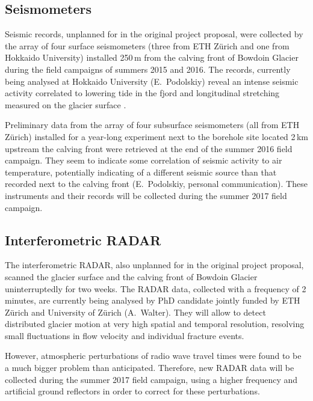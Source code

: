 \documentclass{article}
\begin{document}
\subsection{Seismometers}

Seismic records, unplanned for in the original project proposal, were collected
by the array of four surface seismometers (three from ETH Zürich and one from
Hokkaido University) installed 250\,m from the calving front of Bowdoin Glacier
during the field campaigns of summers 2015 and 2016. The records, currently
being analysed at Hokkaido University (E.~Podolskiy) reveal an intense seismic
activity correlated to lowering tide in the fjord and longitudinal stretching
measured on the glacier surface \citep{Podolskiy.etal.2016}.

Preliminary data from the array of four subsurface seismometers (all from ETH
Zürich) installed for a year-long experiment next to the borehole site located
2\,km upstream the calving front were retrieved at the end of the summer 2016
field campaign. They seem to indicate some correlation of seismic activity to
air temperature, potentially indicating of a different seismic source than that
recorded next to the calving front (E.~Podolskiy, personal communication).
These instruments and their records will be collected during the summer 2017
field campaign.


\subsection{Interferometric RADAR}

The interferometric RADAR, also unplanned for in the original project proposal,
scanned the glacier surface and the calving front of Bowdoin Glacier
uninterruptedly for two weeks. The RADAR data, collected with a frequency of
2\,minutes, are currently being analysed by PhD candidate jointly funded by
ETH Zürich and University of Zürich (A.~Walter). They will allow to detect
distributed glacier motion at very high spatial and temporal resolution,
resolving small fluctuations in flow velocity and individual fracture events.

However, atmospheric perturbations of radio wave travel times were found to be
a much bigger problem than anticipated. Therefore, new RADAR data will be
collected during the summer 2017 field campaign, using a higher frequency and
artificial ground reflectors in order to correct for these perturbations.


\end{document}
